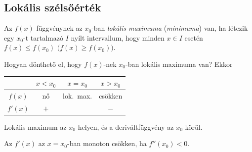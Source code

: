 \documentclass[11pt]{article}
\newcommand{\signtable}{\renewcommand{\arraystretch}{1.45}}
\begin{document}
\subsection{Lokális szélsőérték}

\begin{defbox}
\begin{definition}
Az $f(x)$ függvénynek az $x_{0}$-ban \emph{lokális maximuma} (\emph{minimuma}) van, ha létezik egy $x_{0}$-t tartalmazó $I$ nyílt intervallum, hogy minden $x\in I$ esetén $f(x)\le f(x_{0})$ $\bigl(f(x)\ge f(x_{0})\bigr)$.
\end{definition}
\end{defbox}

\noindent Hogyan dönthető el, hogy $f(x)$-nek $x_{0}$-ban lokális maximuma van? Ekkor
\begin{center}
\signtable
\begin{tabular}{c|ccc}
\hline
 & $x<x_{0}$ & $x=x_{0}$ & $x>x_{0}$\\
\hline
$f(x)$ & nő & lok.\ max. & csökken\\
$f'(x)$ & $+$ & & $-$\\
\hline
\end{tabular}
\end{center}

\begin{notefig}{Lokális maximum az $x_{0}$ helyen, és a deriváltfüggvény az $x_{0}$ körül.}
\hspace{1.5em}
\end{notefig}

\noindent Az $f'(x)$ az $x=x_{0}$-ban monoton csökken, ha $f''(x_{0})<0$.
\end{document}
